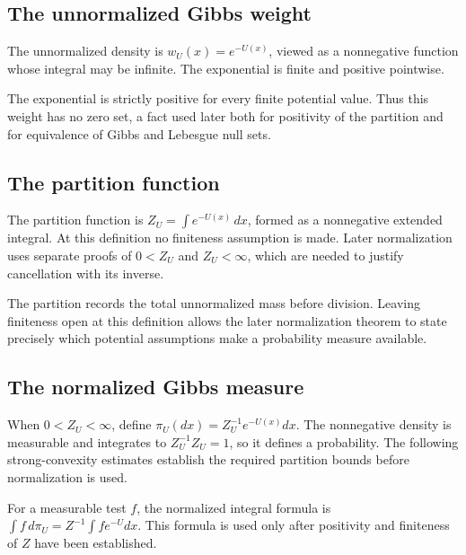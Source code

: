 \documentclass[11pt,a4paper]{article}
\begin{document}
\subsection{\texorpdfstring{The unnormalized Gibbs weight}{The unnormalized Gibbs weight}}


The unnormalized density is \(w_U(x)=e^{-U(x)}\), viewed as a nonnegative function whose integral may be infinite. The exponential is finite and positive pointwise.



The exponential is strictly positive for every finite potential value. Thus this weight has no zero set, a fact used later both for positivity of the partition and for equivalence of Gibbs and Lebesgue null sets.


\subsection{\texorpdfstring{The partition function}{The partition function}}


The partition function is \(Z_U=\int e^{-U(x)}\,dx\), formed as a nonnegative extended integral. At this definition no finiteness assumption is made. Later normalization uses separate proofs of \(0<Z_U\) and \(Z_U<\infty\), which are needed to justify cancellation with its inverse.



The partition records the total unnormalized mass before division. Leaving finiteness open at this definition allows the later normalization theorem to state precisely which potential assumptions make a probability measure available.


\subsection{\texorpdfstring{The normalized Gibbs measure}{The normalized Gibbs measure}}


When \(0<Z_U<\infty\), define \(\pi_U(dx)=Z_U^{-1}e^{-U(x)}dx\). The nonnegative density is measurable and integrates to \(Z_U^{-1}Z_U=1\), so it defines a probability. The following strong-convexity estimates establish the required partition bounds before normalization is used.



For a measurable test \(f\), the normalized integral formula is \(\int f\,d\pi_U=Z^{-1}\int fe^{-U}dx\). This formula is used only after positivity and finiteness of \(Z\) have been established.
\end{document}
